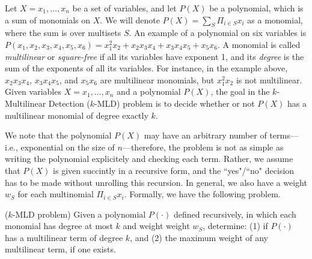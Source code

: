 Let $X = x_1, \ldots,x_n$ be a set of variables, and let $P(X)$ be a polynomial, which is a sum 
of monomials on $X$. We will denote $P(X)=\sum_S \Pi_{i\in S} x_i$ as a monomial, where
the sum is over multisets $S$.  An example of a polynomial on six variables is 
$P(x_1,x_2,x_3,x_4, x_5, x_6) = x_1^2x_2 + x_2x_3x_4 + x_3x_4x_5 + x_5x_6$. 
A monomial is called \emph{multilinear} or \emph{square-free} if all its variables 
have exponent 1, and its \emph{degree} is the sum of the exponents of all its variables. 
For instance, in the example above, $x_2x_3x_4$, $x_3x_4x_5$, and $x_5x_6$ are multilinear monomials, but $x_1^2x_2$ is not multilinear. 
Given variables $X = x_1, \ldots ,x_n$ and a polynomial $P(X)$, the goal in 
the $k$-Multilinear Detection (\textsc{$k$-MLD}) problem
is to decide whether or not $P(X)$ has a multilinear monomial of degree exactly $k$. 

We note that the polynomial $P(X)$ may have an arbitrary number of terms---i.e., exponential on the size of $n$---therefore, the problem is not as simple as writing the polynomial explicitely and checking each term. Rather, we assume that $P(X)$ is given succintly in a recursive form, and the ``yes"/``no" decision has to be made without unrolling this recursion.
In general, we also have a weight $w_S$ for each multinomial $\Pi_{i\in S} x_i$. Formally, we have the following problem.


\begin{problem} (\textsc{$k$-MLD} problem)
Given a polynomial $P(\cdot)$ defined recursively,
in which each monomial
has degree at most $k$ and weight weight $w_S$, determine:
(1) if $P(\cdot)$ has a multilinear term of degree $k$, and 
(2) the maximum weight of any multilinear term, if one exists.
\end{problem}

